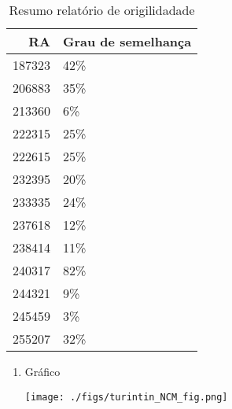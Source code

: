 \documentclass[11pt]{article}
\begin{document}
\begin{table}[htbp]
\caption{\label{TurnitinNCM}Resumo relatório de origilidadade}
\centering
\begin{tabular}{rl}
\hline
RA & Grau de semelhança\\
\hline
187323 & 42\%\\
206883 & 35\%\\
213360 & 6\%\\
222315 & 25\%\\
222615 & 25\%\\
232395 & 20\%\\
233335 & 24\%\\
237618 & 12\%\\
238414 & 11\%\\
240317 & 82\%\\
244321 & 9\%\\
245459 & 3\%\\
255207 & 32\%\\
\hline
\end{tabular}
\end{table}
\begin{enumerate}
\item Gráfico
\label{sec:orgac51bf9}
\begin{center}
\texttt{[image: ./figs/turintin\_NCM\_fig.png]}
\end{center}
\end{enumerate}
\end{document}
